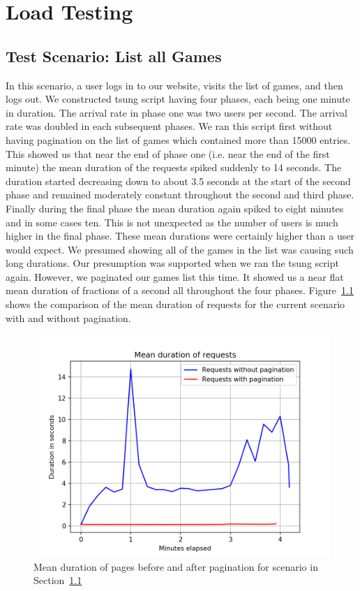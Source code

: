 \chapter{Load Testing}

\section{Test Scenario: List all Games}\label{sec:scenario-list-all-games}
In this scenario, a user logs in to our website, visits the list of games, and then logs out. We constructed tsung script having four phases, each being one minute in duration. The arrival rate in phase one was two users per second. The arrival rate was doubled in each subsequent phases. We ran this script first without having pagination on the list of games which contained more than 15000 entries. This showed us that near the end of phase one (i.e. near the end of the first minute) the mean duration of the requests spiked suddenly to 14 seconds. The duration started decreasing down to about 3.5 seconds at the start of the second phase and remained moderately constant throughout the second and third phase. Finally during the final phase the mean duration again spiked to eight minutes and in some cases ten. This is not unexpected as the number of users is much higher in the final phase. These mean durations were certainly higher than a user would expect. We presumed showing all of the games in the list was causing such long durations. Our presumption was supported when we ran the tsung script again. However, we paginated our games list this time. It showed us a near flat mean duration of fractions of a second all throughout the four phases. Figure~\ref{fig:effect-of-pagination-on-game-list} shows the comparison of the mean duration of requests for the current scenario with and without pagination.

\begin{figure}
\centering
\includegraphics{images/tsung/request_mean_game_index_pagination.png}
\caption{Mean duration of pages before and after pagination for scenario in Section~\ref{sec:scenario-list-all-games}}\label{fig:effect-of-pagination-on-game-list}
\end{figure}

